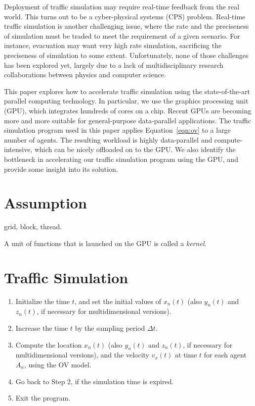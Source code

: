 \documentclass[times, 10pt, twocolumn]{article}
\begin{document}
Deployment of traffic simulation may require real-time feedback from the
real world.
This turns out to be a cyber-physical systems (CPS) problem.
Real-time traffic simulation is another challenging issue, where
the rate and the preciseness of simulation must be traded to meet the
requirement of a given scenario.
For instance, evacuation may want very high rate simulation, sacrificing
the preciseness of simulation to some extent.
Unfortunately, none of those challenges has been explored yet, largely
due to a lack of multidisciplinary research collaborations between physics
and computer science.

This paper explores how to accelerate traffic simulation using the
state-of-the-art parallel computing technology.
In particular, we use the graphics processing unit (GPU), which
integrates hundreds of cores on a chip.
Recent GPUs are becoming more and more suitable for general-purpose
data-parallel applications.
The traffic simulation program used in this paper applies
Equation~\eqref{eqn:ov} to a large number of agents.
The resulting workload is highly data-parallel and compute-intensive,
which can be nicely offloaded on to the GPU.
We also identify the bottleneck in accelerating our traffic simulation
program using the GPU, and provide some insight into its solution.

\section{Assumption}
\label{sec:assumption}

grid, block, thread.

A unit of functions that is launched on the GPU is called a \textit{kernel}.

\section{Traffic Simulation}
\label{sec:traffic_simulation}

\begin{enumerate}
 \item Initialize the time $t$, and set the initial values of $x_n(t)$
       (also $y_n(t)$ and $z_n(t)$, if necessary for multidimensional
       versions).
 \item Increase the time $t$ by the sampling period $\Delta t$.
 \item Compute the location $x_n(t)$ (also $y_n(t)$ and $z_n(t)$, if
       necessary for multidimensional versions), and the velocity
       $v_x(t)$ at time $t$ for each agent $A_n$, using the OV model.
 \item Go back to Step 2, if the simulation time is expired.
 \item Exit the program.
\end{enumerate}
\end{document}
